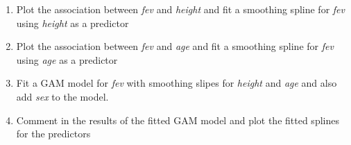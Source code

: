 \documentclass[
]{book}
\begin{document}
\begin{enumerate}
\def\labelenumi{\alph{enumi})}
\item
  Plot the association between \emph{fev} and \emph{height} and fit a smoothing spline for \emph{fev} using \emph{height} as a predictor
\item
  Plot the association between \emph{fev} and \emph{age} and fit a smoothing spline for \emph{fev} using \emph{age} as a predictor
\item
  Fit a GAM model for \emph{fev} with smoothing slipes for \emph{height} and \emph{age} and also add \emph{sex} to the model.
\item
  Comment in the results of the fitted GAM model and plot the fitted splines for the predictors
\end{enumerate}
\end{document}
